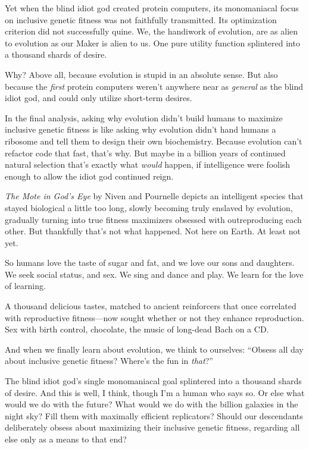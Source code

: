 {
 Yet when the blind idiot god created protein computers, its
monomaniacal focus on inclusive genetic fitness was not faithfully
transmitted. Its optimization criterion did not successfully quine. We,
the handiwork of evolution, are as alien to evolution as our Maker is
alien to us. One pure utility function splintered into a thousand
shards of desire.}

{
 Why? Above all, because evolution is stupid in an absolute sense.
But also because the \textit{first} protein computers
weren't anywhere near as \textit{general} as the blind
idiot god, and could only utilize short-term desires.}

{
 In the final analysis, asking why evolution didn't
build humans to maximize inclusive genetic fitness is like asking why
evolution didn't hand humans a ribosome and tell them
to design their own biochemistry. Because evolution
can't refactor code that fast, that's
why. But maybe in a billion years of continued natural selection
that's exactly what \textit{would} happen, if
intelligence were foolish enough to allow the idiot god continued
reign.}

{
 \textit{The Mote in God's Eye} by Niven and
Pournelle depicts an intelligent species that stayed biological a
little too long, slowly becoming truly enslaved by evolution, gradually
turning into true fitness maximizers obsessed with outreproducing each
other. But thankfully that's not what happened. Not
here on Earth. At least not yet.}

{
 So humans love the taste of sugar and fat, and we love our sons
and daughters. We seek social status, and sex. We sing and dance and
play. We learn for the love of learning.}

{
 A thousand delicious tastes, matched to ancient reinforcers that
once correlated with reproductive fitness---now sought whether or not
they enhance reproduction. Sex with birth control, chocolate, the music
of long-dead Bach on a CD.}

{
 And when we finally learn about evolution, we think to ourselves:
``Obsess all day about inclusive genetic fitness?
Where's the fun in \textit{that}?''}

{
 The blind idiot god's single monomaniacal goal
splintered into a thousand shards of desire. And this is well, I think,
though I'm a human who says so. Or else what would we
do with the future? What would we do with the billion galaxies in the
night sky? Fill them with maximally efficient replicators? Should our
descendants deliberately obsess about maximizing their inclusive
genetic fitness, regarding all else only as a means to that end?}

